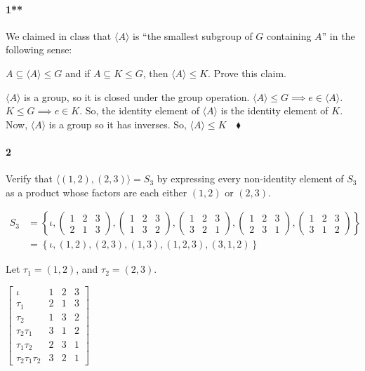 \documentclass{article}
\begin{document}
\paragraph{1**} We claimed in class that $\langle{A}  \rangle$ is “the smallest subgroup of $G$ containing $A$” in the following
sense:

$ A ⊆ \langle A\rangle ≤ G$ and if $A ⊆ K ≤ G$, then $\langle A\rangle ≤ K$. Prove this claim.


$\langle A \rangle$ is a group, so it is closed under the group
operation. $\langle A \rangle\leq G \implies e \in \langle A
\rangle$. $K\leq G \implies e\in K$. So, the identity element of
$\langle A\rangle$
is the identity element of $K$. Now, $\langle A \rangle$ is a group so
it has inverses. So, $\langle A \rangle \leq K\quad \blacklozenge$
\newpage
\paragraph{2} Verify that $\langle (1,2),(2,3) \rangle = S_3$  by
expressing every non-identity element of $S_3$ as a product whose
factors are each either $(1,2)$ or $(2,3)$.

\begin{align*}
S_3 &= \left\{
  \iota, \begin{pmatrix}1&2&3\\2&1&3 \end{pmatrix},\begin{pmatrix}1&2&3\\1&3&2 \end{pmatrix},
                                                                              \begin{pmatrix}1&2&3\\3&2&1 \end{pmatrix}, \begin{pmatrix}1&2&3\\2&3&1 \end{pmatrix},\begin{pmatrix}1&2&3\\3&1&2 \end{pmatrix}\right\}\\
    &= \left\{
  \iota, (1,2),(2,3),(1,3), (1,2,3), (3,1,2)\right\}
\end{align*}

Let $\tau_1 = (1,2)$, and $\tau_2 = (2,3).$

$\begin{bmatrix}
  \iota& 1&2&3\\
  \tau_1& 2&1&3\\
  \tau_2& 1&3&2\\ \tau_2\tau_1&
         3&1&2\\ \tau_1\tau_2&
         2&3&1\\ \tau_2\tau_1\tau_2&
         3&2&1
 \end{bmatrix}$
\end{document}

